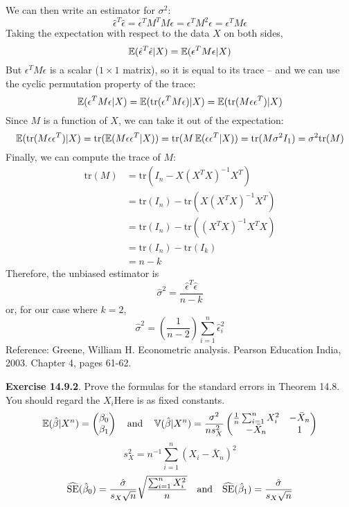 We can then write an estimator for \(\sigma^{2}\):
\[
\hat{\epsilon}^T \hat{\epsilon} = \epsilon^T M^T M \epsilon = \epsilon^T M^{2} \epsilon = \epsilon^T M \epsilon
\]
Taking the expectation with respect to the data \(X\) on both sides,
\[
\operatorname{\mathbb{E}}(\hat{\epsilon}^T \hat{\epsilon} | X) = \operatorname{\mathbb{E}}(\epsilon^T M \epsilon | X)
\]
But \(\epsilon^T M \epsilon\) is a scalar (\(1 \times 1\) matrix), so it
is equal to its trace -- and we can use the cyclic permutation property
of the trace:
\[
\operatorname{\mathbb{E}}(\epsilon^T M \epsilon | X) = \operatorname{\mathbb{E}}(\text{tr}(\epsilon^T M \epsilon) | X) = \operatorname{\mathbb{E}}(\text{tr}(M \epsilon \epsilon^T) | X)
\]
Since \(M\) is a function of \(X\), we can take it out of the
expectation:
\[
\operatorname{\mathbb{E}}(\text{tr}(M \epsilon \epsilon^T) | X) = \text{tr}(\operatorname{\mathbb{E}}(M \epsilon \epsilon^T | X))
= \text{tr}(M \operatorname{\mathbb{E}}(\epsilon \epsilon^T | X))
= \text{tr}(M \sigma^{2} I_{1})
= \sigma^{2} \text{tr}(M)
\]
Finally, we can compute the trace of \(M\):
\begin{align*}
\text{tr}(M) &= \text{tr}(I_{n} - X(X^T X)^{-1}X^T)\\
&= \text{tr}(I_{n}) - \text{tr}(X(X^T X)^{-1}X^T) \\
&= \text{tr}(I_{n}) - \text{tr}((X^T X)^{-1}X^T X) \\
&= \text{tr}(I_{n}) - \text{tr}(I_{k})  \\
&= n - k
\end{align*}
Therefore, the unbiased estimator is
\[
\hat{\sigma}^{2} = \frac{\hat{\epsilon}^T \hat{\epsilon}}{n - k}
\]
or, for our case where \(k = 2\),
\[
\hat{\sigma}^{2} = \left( \frac{1}{n - 2} \right) \sum_{i=1}^{n} \hat{\epsilon}_{i}^{2}
\]
Reference: Greene, William H. Econometric analysis. Pearson Education
India, 2003. Chapter 4, pages 61-62.

\textbf{Exercise 14.9.2}. Prove the formulas for the standard errors in
Theorem 14.8. You should regard the \(X_{i}\)Here is as fixed constants.
\[
\operatorname{\mathbb{E}}(\hat{\beta} | X^{n}) = \begin{pmatrix}\beta_{0} \\ \beta_{1} \end{pmatrix}
\quad \text{and} \quad
\operatorname{\mathbb{V}}(\hat{\beta} | X^{n}) = \frac{\sigma^{2}}{n s_X^{2}} \begin{pmatrix} 
\frac{1}{n} \sum_{i=1}^{n} X_{i}^{2} & -\bar{X}_{n} \\
-\bar{X}_{n} & 1
\end{pmatrix}
\]
\[
s_X^{2} = n^{-1} \sum_{i=1}^{n} (X_{i} - \bar{X}_{n})^{2}
\]
\[
\widehat{\operatorname{\mathrm{SE}}}(\hat{\beta}_{0}) = \frac{\hat{\sigma}}{s_X \sqrt{n}} \sqrt{\frac{\sum_{i=1}^{n} X_{i}^{2}}{n}}
\quad \text{and} \quad
\widehat{\operatorname{\mathrm{SE}}}(\hat{\beta}_{1}) = \frac{\hat{\sigma}}{s_X \sqrt{n}}
\]

